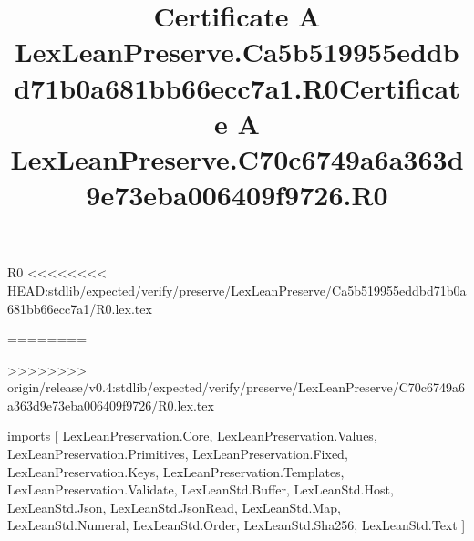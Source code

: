 \begin{lexlean}{R0}
<<<<<<<< HEAD:stdlib/expected/verify/preserve/LexLeanPreserve/Ca5b519955eddbd71b0a681bb66ecc7a1/R0.lex.tex
\title{Certificate A LexLeanPreserve.Ca5b519955eddbd71b0a681bb66ecc7a1.R0}
========
\title{Certificate A LexLeanPreserve.C70c6749a6a363d9e73eba006409f9726.R0}
>>>>>>>> origin/release/v0.4:stdlib/expected/verify/preserve/LexLeanPreserve/C70c6749a6a363d9e73eba006409f9726/R0.lex.tex
\begin{coremodule}
imports [
  LexLeanPreservation.Core,
  LexLeanPreservation.Values,
  LexLeanPreservation.Primitives,
  LexLeanPreservation.Fixed,
  LexLeanPreservation.Keys,
  LexLeanPreservation.Templates,
  LexLeanPreservation.Validate,
  LexLeanStd.Buffer,
  LexLeanStd.Host,
  LexLeanStd.Json,
  LexLeanStd.JsonRead,
  LexLeanStd.Map,
  LexLeanStd.Numeral,
  LexLeanStd.Order,
  LexLeanStd.Sha256,
  LexLeanStd.Text
]


\end{coremodule}
\end{lexlean}

